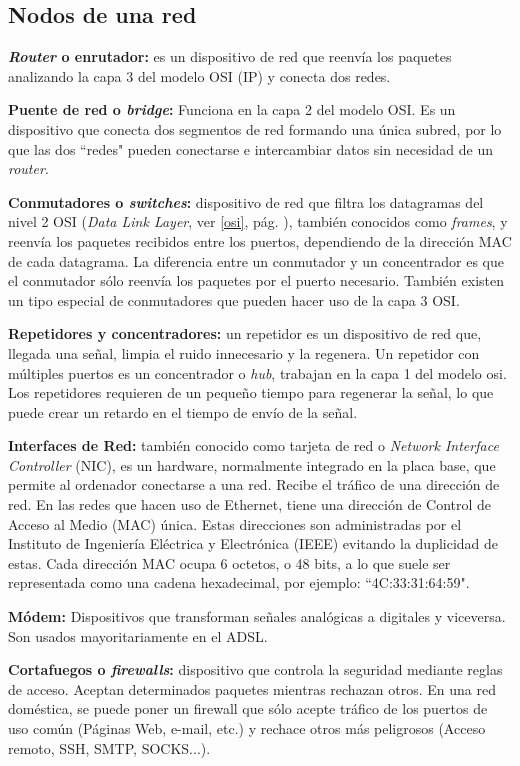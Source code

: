 \documentclass[a4paper, 11pt]{report} %
\begin{document}
\subsection{Nodos de una red}
\begin{description}
\item \textbf{\textit{Router} o enrutador:} es un dispositivo de red que reenvía los paquetes analizando la capa 3 del modelo OSI (IP) y conecta dos redes.
\item \textbf{Puente de red o \textit{bridge}:} Funciona en la capa 2 del modelo OSI. Es un dispositivo que conecta dos segmentos de red formando una única subred, por lo que las dos ``redes" pueden conectarse e intercambiar datos sin necesidad de un \textit{router}.
\item \textbf{Conmutadores o \textit{switches}:} dispositivo de red que filtra los datagramas del nivel 2 OSI (\textit{Data Link Layer}, ver \ref{osi}, pág. \pageref{osi}), también conocidos como \textit{frames}, y reenvía los paquetes recibidos entre los puertos, dependiendo de la dirección MAC de cada datagrama. La diferencia entre un conmutador y un concentrador es que el conmutador sólo reenvía los paquetes por el puerto necesario. También existen un tipo especial de conmutadores que pueden hacer uso de la capa 3 OSI.
\item \textbf{Repetidores y concentradores:} un repetidor es un dispositivo de red que, llegada una señal, limpia el ruido innecesario y la regenera. Un repetidor con múltiples puertos es un concentrador o \textit{hub}, trabajan en la capa 1 del modelo \acrshort{osi}. Los repetidores requieren de un pequeño tiempo para regenerar la señal, lo que puede crear un retardo en el tiempo de envío de la señal.
\item \textbf{Interfaces de Red:} también conocido como tarjeta de red o \textit{Network Interface Controller} (NIC), es un \gls{hardware}, normalmente integrado en la placa base, que permite al ordenador conectarse a una red. Recibe el tráfico de una dirección de red. En las redes que hacen uso de Ethernet, tiene una dirección de Control de Acceso al Medio (\acrshort{MAC}) única. Estas direcciones son administradas por el Instituto de Ingeniería Eléctrica y Electrónica (\acrshort{IEEE}) evitando la duplicidad de estas. Cada dirección MAC ocupa 6 octetos, o 48 bits, a lo que suele ser representada como una cadena hexadecimal, por ejemplo: ``4C:33:31:64:59".
\item \textbf{Módem:} Dispositivos que transforman señales analógicas a digitales y viceversa. Son usados mayoritariamente en el \acrshort{ADSL}.
\item \textbf{Cortafuegos o \textit{firewalls}:} dispositivo que controla la seguridad mediante reglas de acceso. Aceptan determinados paquetes mientras rechazan otros. En una red doméstica, se puede poner un firewall que sólo acepte tráfico de los puertos de uso común (Páginas Web, e-mail, etc.) y rechace otros más peligrosos (Acceso remoto, SSH, SMTP, SOCKS...).
\end{description}
\end{document}

